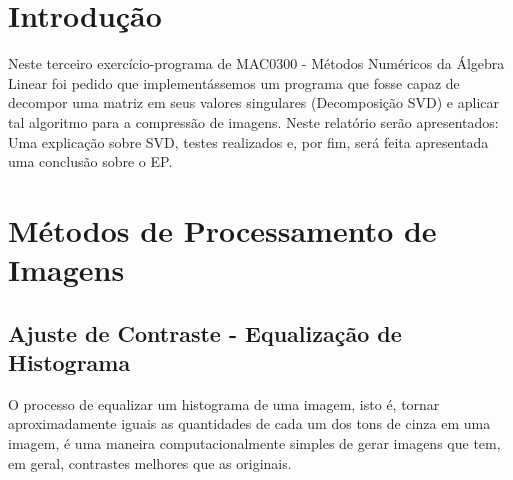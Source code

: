 \documentclass[brazil,times]{abnt}
\begin{document}





\data{\today}

\capa

\folhaderosto

\tableofcontents

\chapter{Introdução\label{cap:introducao}}
	Neste terceiro exercício-programa de MAC0300 - Métodos Numéricos da Álgebra Linear foi pedido que implementássemos um programa que fosse capaz de decompor uma matriz em seus valores singulares (Decomposição SVD) e aplicar tal algoritmo para a compressão de imagens. Neste relatório serão apresentados: Uma explicação sobre SVD, testes realizados e, por fim, será feita apresentada uma conclusão sobre o EP.





\chapter{Métodos de Processamento de Imagens}

	\section{Ajuste de Contraste - Equalização de Histograma}
		O processo de equalizar um histograma de uma imagem, isto é, tornar aproximadamente iguais as quantidades de cada um dos tons de cinza em uma imagem, é uma maneira computacionalmente simples de gerar imagens que tem, em geral, contrastes melhores que as originais.
\end{document}
